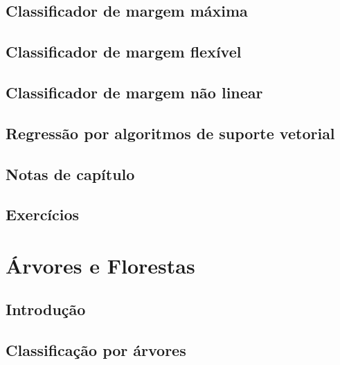 \documentclass[
]{latex/krantz}
\theoremstyle{definition}
\theoremstyle{definition}
\theoremstyle{definition}
\theoremstyle{definition}
\theoremstyle{remark}
\begin{document}
\hypertarget{classificador-de-margem-muxe1xima}{%
\section{Classificador de margem máxima}\label{classificador-de-margem-muxe1xima}}

\hypertarget{classificador-de-margem-flexuxedvel}{%
\section{Classificador de margem flexível}\label{classificador-de-margem-flexuxedvel}}

\hypertarget{classificador-de-margem-nuxe3o-linear}{%
\section{Classificador de margem não linear}\label{classificador-de-margem-nuxe3o-linear}}

\hypertarget{regressuxe3o-por-algoritmos-de-suporte-vetorial}{%
\section{Regressão por algoritmos de suporte vetorial}\label{regressuxe3o-por-algoritmos-de-suporte-vetorial}}

\hypertarget{notas-de-capuxedtulo-8}{%
\section{Notas de capítulo}\label{notas-de-capuxedtulo-8}}

\hypertarget{exercuxedcios-8}{%
\section{Exercícios}\label{exercuxedcios-8}}

\hypertarget{uxe1rvores-e-florestas}{%
\chapter{Árvores e Florestas}\label{uxe1rvores-e-florestas}}

\hypertarget{introduuxe7uxe3o-9}{%
\section{Introdução}\label{introduuxe7uxe3o-9}}

\hypertarget{classificauxe7uxe3o-por-uxe1rvores}{%
\section{Classificação por árvores}\label{classificauxe7uxe3o-por-uxe1rvores}}
\end{document}
